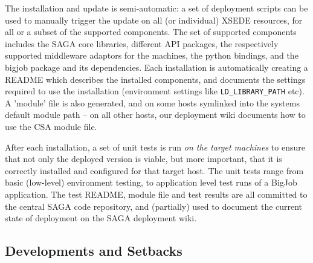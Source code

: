 \documentclass{sig-alternate}
\begin{document}
 The installation and update is semi-automatic: a set of deployment
 scripts can be used to manually trigger the update on all (or
 individual) XSEDE resources, for all or a subset of the supported
 components.  The set of supported components includes the SAGA core
 libraries, different API packages, the respectively supported
 middleware adaptors for the machines, the python bindings, and the
 bigjob package and its dependencies.  Each installation is
 automatically creating a README which describes the installed
 components, and documents the settings required to use the
 installation (environment settings like \texttt{LD\_LIBRARY\_PATH} etc).  A
 'module' file is also generated, and on some hosts symlinked into the
 systems default module path -- on all other hosts, our deployment
 wiki documents how to use the CSA module file.

 After each installation, a set of unit tests is run \textit{on the
 target machines} to ensure that not only the deployed version is
 viable, but more important, that it is correctly installed and
 configured for that target host.  The unit tests range from basic
 (low-level) environment testing, to application level test runs of a
 BigJob application.  The test README, module file and test results
 are all committed to the central SAGA code repository, and
 (partially) used to document the current state of deployment on the
 SAGA deployment wiki.



\subsection{Developments and Setbacks}


 
\end{document}
